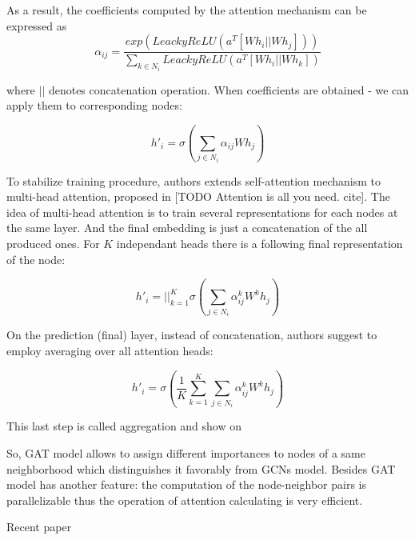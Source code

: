 As a result, the coefficients computed by the attention mechanism can be expressed as
\begin{equation}
    \alpha_{ij} = \frac{exp(LeackyReLU(a^{T}[Wh_i || Wh_j]))}{\sum_{k \in N_i}LeackyReLU(a^{T}[Wh_i || Wh_k])}
    \label{eq:final_att_coef}
 \end{equation}

where $||$ denotes concatenation operation. When coefficients are obtained - we can apply them to corresponding nodes:

\begin{equation}
    h'_i = \sigma \left( \sum_{j \in {N_i}} \alpha_{ij} W h_j \right)
    \label{eq:final_att}
 \end{equation}

To stabilize training procedure, authors extends self-attention mechanism
to multi-head attention, proposed in [TODO Attention is all you need. cite].
The idea of multi-head attention is to train several representations for each nodes at the same layer. And the final embedding
is just a concatenation of the all produced ones. For $K$ independant heads  there is a following final representation of the node:


\begin{equation}
    h'_i = ||_{k=1}^{K}  \sigma \left( \sum_{j \in {N_i}} \alpha^{k}_{ij} W^{k} h_j \right)
    \label{eq:multihead}
\end{equation}

On the prediction (final) layer, instead of concatenation, authors suggest to employ averaging over all attention heads:

\begin{equation}
    h'_i =  \sigma \left( \frac{1}{K} \sum_{k=1}^{K} \sum_{j \in {N_i}} \alpha^{k}_{ij} W^{k} h_j \right)
    \label{eq:multihead2}
\end{equation}

This last step is called aggregation and show on %

So, GAT model allows to assign different importances to nodes of a same neighborhood which distinguishes it favorably from GCNs
model. Besides GAT model has another feature: the computation of the node-neighbor pairs is parallelizable thus the operation
of attention calculating is very efficient.


Recent paper \cite{GCNII}





